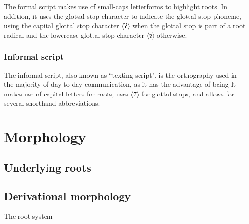\documentclass[a4paper,10pt,twoside,openright]{memoir}
\newcommand{\sqbrack}[1]{$\langle$#1$\rangle$}
\newcommand{\bigglot}{Ɂ}
\newcommand{\lilglot}{ɂ}
\begin{document}
The formal script makes use of small-caps letterforms to highlight roots. In addition, it uses the glottal stop character to indicate the glottal stop phoneme, using the capital glottal stop character \sqbrack{\bigglot} when the glottal stop is part of a root radical and the lowercase glottal stop character \sqbrack{\lilglot} otherwise.

\subsection{Informal script}

The informal script, also known as ``texting script", is the orthography used in the majority of day-to-day communication, as it has the advantage of being  It makes use of capital letters for roots, uses \sqbrack{7} for glottal stops, and allows for several shorthand abbreviations. 

\chapter{Morphology}
\section{Underlying roots}
\section{Derivational morphology}

The root system
\end{document}
